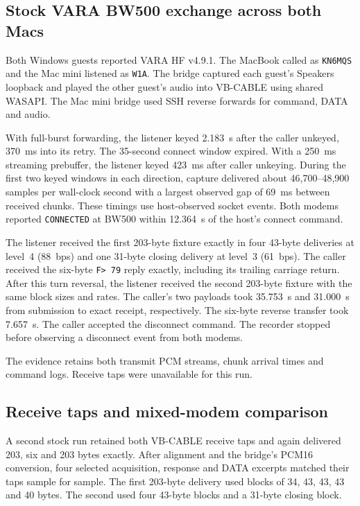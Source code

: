 \documentclass[11pt,a4paper]{article}
\begin{document}
\subsection{Stock VARA BW500 exchange across both Macs}

Both Windows guests reported VARA HF v4.9.1. The MacBook called
as \texttt{KN6MQS} and the Mac mini listened as \texttt{W1A}.
The bridge captured each guest's Speakers loopback and played the
other guest's audio into VB-CABLE using shared WASAPI. The Mac mini
bridge used SSH reverse forwards for command, DATA and audio.

With full-burst forwarding, the listener keyed 2.183~s after the
caller unkeyed, 370~ms into its retry. The 35-second connect window
expired. With a 250~ms streaming prebuffer, the listener keyed
423~ms after caller unkeying. During the first two
keyed windows in each direction, capture delivered about
46,700--48,900 samples per wall-clock second with a largest observed
gap of 69~ms between received chunks. These timings use host-observed
socket events. Both modems reported \texttt{CONNECTED} at BW500
within 12.364~s of the host's connect command.

The listener received the first 203-byte fixture exactly in four
43-byte deliveries at level~4 (88~bps) and one 31-byte closing
delivery at level~3 (61~bps). The caller received the six-byte
\texttt{F> 79} reply exactly, including its trailing carriage
return. After this turn reversal, the listener received the second
203-byte fixture with the same block sizes and rates. The caller's
two payloads took 35.753~s and 31.000~s from submission to exact
receipt, respectively. The six-byte reverse transfer took 7.657~s.
The caller accepted the disconnect command. The recorder stopped
before observing a disconnect event from both modems.

The evidence retains both transmit PCM streams, chunk arrival
times and command logs. Receive taps were unavailable for this run.

\subsection{Receive taps and mixed-modem comparison}

A second stock run retained both VB-CABLE receive taps and again
delivered 203, six and 203 bytes exactly. After alignment and the
bridge's PCM16 conversion, four selected acquisition, response
and DATA excerpts matched their taps sample for sample. The first
203-byte delivery used blocks of 34, 43, 43, 43 and 40 bytes.
The second used four 43-byte blocks and a 31-byte closing block.
\end{document}
